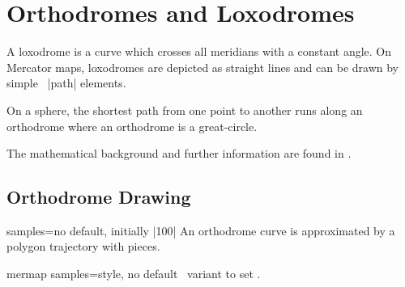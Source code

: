 \clearpage
\section{Orthodromes and Loxodromes}\label{sec:orthodromes}%

A loxodrome is a curve which crosses all meridians with
a constant angle. On Mercator maps, loxodromes are depicted as straight lines
and can be drawn by simple \tikzname\ |path| elements.

On a sphere, the shortest path
from one point to another runs along an orthodrome where
an orthodrome is a great-circle.

The mathematical background and further information are found in \cite{Sturm:2020}.


\subsection{Orthodrome Drawing}

\begin{docMrcKey}{samples}{=}{no default, initially |100|}
  An orthodrome curve is approximated by a polygon trajectory with
   pieces.
\end{docMrcKey}


\begin{docTikzKey}{mermap samples}{=}{style, no default}
  \tikzname\ variant to set .
\end{docTikzKey}

\enlargethispage*{1cm}

